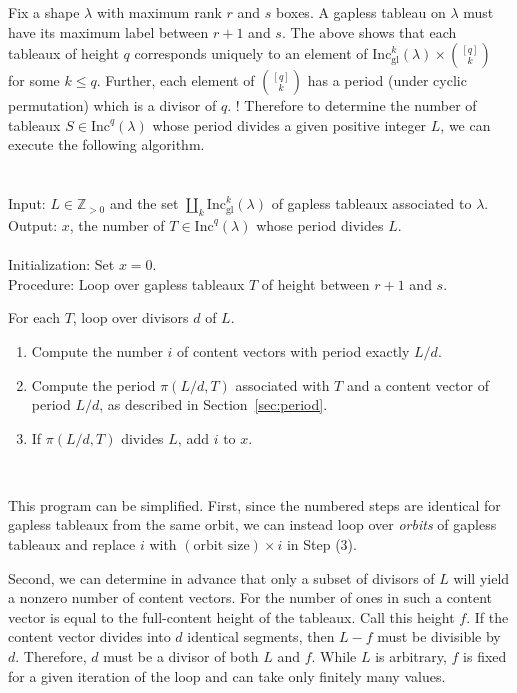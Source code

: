 \documentclass[12pt]{amsart}
\theoremstyle{definition}
\theoremstyle{remark}
\numberwithin{equation}{section}
\newcommand{\inc}{\ensuremath{\mathrm{Inc}}}
\newcommand{\incgl}{\inc_{\mathrm{gl}}}
\begin{document}
Fix a shape $\lambda$ with maximum rank $r$ and $s$ boxes.  A gapless tableau on $\lambda$ must have its maximum label between $r+1$ and $s$.  The above shows that each tableaux of height $q$ corresponds uniquely to an element of $\incgl^k(\lambda) \times \binom{[q]}{k}$ for some $k \leq q$. Further, each element of $\binom{[q]}{k}$ has a period (under cyclic permutation) which is a divisor of $q$. ! Therefore to determine the number of tableaux $S \in \inc^q(\lambda)$ whose period divides a given positive integer $L$, we can execute the following algorithm.
\-\ \\ \-\ \\ 
 \\ \noindent
\textsf{Input}:  $L \in \mathbb{Z}_{>0}$ and the set $\coprod_k \incgl^k(\lambda)$ of gapless tableaux associated to $\lambda$. \\ \noindent
\textsf{Output}: $x$, the number of $T \in \inc^q(\lambda)$ whose period divides $L$. \\  \-\ \\ 
\textsf{Initialization}: Set $x = 0$. \\
\textsf{Procedure}: Loop over gapless tableaux $T$ of height between $r+1$ and $s$.
\begin{arrowlist}
\item For each $T$, loop over divisors $d$ of $L$.
\begin{enumerate}
\item   Compute the number $i$ of content vectors with period exactly $L/d$. \item Compute the period $\pi(L/d,T)$ associated with $T$ and a content vector of period $L/d$, as described in Section~\ref{sec:period}. 
\item If $\pi(L/d,T)$ divides $L$, add $i$ to $x$.
\end{enumerate}
\end{arrowlist} \-\ 

This program can be simplified. First, since the numbered steps are identical for gapless tableaux from the same orbit, we can instead loop over {\it orbits} of gapless tableaux and replace $i$ with $(\text{orbit size}) \times i$ in Step (3).

Second, we can determine in advance that only a subset of divisors of $L$ will yield a nonzero number of content vectors. For the number of ones in such a content vector is equal to the full-content height of the tableaux. Call this height $f$. If the content vector divides into $d$ identical segments, then $L-f$ must be divisible by $d$. Therefore, $d$ must be a divisor of both $L$ and $f$. While $L$ is arbitrary, $f$ is fixed for a given iteration of the loop and can take only finitely many values. 
\end{document}
